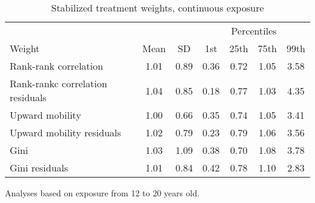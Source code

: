 \begin{table}[htp]
\centering
\footnotesize
\setlength{\tabcolsep}{10pt}
\renewcommand{\arraystretch}{1}
\begin{threeparttable}
\centering
\caption{Stabilized treatment weights, continuous exposure} 
\label{tab:ipt_weigths_continuous}
\begin{tabular}{lcccccc}
  \hline
\multicolumn{3}{c}{} & \multicolumn{4}{c}{Percentiles} \\ 
 \cmidrule{4-7} 
Weight & Mean & SD & 1st & 25th & 75th & 99th \\ 
  \hline
Rank-rank correlation & 1.01 & 0.89 & 0.36 & 0.72 & 1.05 & 3.58 \\ 
  Rank-rankc correlation residuals & 1.04 & 0.85 & 0.18 & 0.77 & 1.03 & 4.35 \\ 
  Upward mobility & 1.00 & 0.66 & 0.35 & 0.74 & 1.05 & 3.41 \\ 
  Upward mobility residuals & 1.02 & 0.79 & 0.23 & 0.79 & 1.06 & 3.56 \\ 
  Gini & 1.03 & 1.09 & 0.38 & 0.70 & 1.08 & 3.78 \\ 
  Gini residuals & 1.01 & 0.84 & 0.42 & 0.78 & 1.10 & 2.83 \\ 
   \hline
\end{tabular}
\begin{tablenotes}
\footnotesize
\item Analyses based on exposure from 12 to 20 years old. 
\end{tablenotes}
\end{threeparttable}
\end{table}

